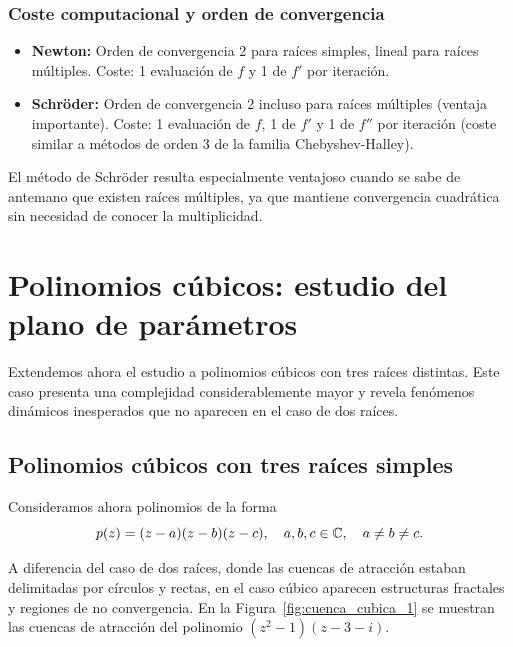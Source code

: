 \subsubsection{Coste computacional y orden de convergencia}

\begin{itemize}
\item \textbf{Newton:} Orden de convergencia 2 para raíces simples, lineal para raíces múltiples. Coste: 1 evaluación de $f$ y 1 de $f'$ por iteración.

\item \textbf{Schröder:} Orden de convergencia 2 incluso para raíces múltiples (ventaja importante). Coste: 1 evaluación de $f$, 1 de $f'$ y 1 de $f''$ por iteración (coste similar a métodos de orden 3 de la familia Chebyshev-Halley).
\end{itemize}

El método de Schröder resulta especialmente ventajoso cuando se sabe de antemano que existen raíces múltiples, ya que mantiene convergencia cuadrática sin necesidad de conocer la multiplicidad.

\section{Polinomios cúbicos: estudio del plano de parámetros}

Extendemos ahora el estudio a polinomios cúbicos con tres raíces distintas. Este caso presenta una complejidad considerablemente mayor y revela fenómenos dinámicos inesperados que no aparecen en el caso de dos raíces.

\subsection{Polinomios cúbicos con tres raíces simples}

Consideramos ahora polinomios de la forma
\begin{equation}
p(z)=(z-a)(z-b)(z-c), \quad a,b,c\in\mathbb{C}, \quad a\ne b\ne c.
\label{eq:poly_cubico}
\end{equation}

A diferencia del caso de dos raíces, donde las cuencas de atracción estaban delimitadas por círculos y rectas, en el caso cúbico aparecen estructuras fractales y regiones de no convergencia. En la Figura~\ref{fig:cuenca_cubica_1} se muestran las cuencas de atracción del polinomio $(z^2-1)(z-3-i)$.

